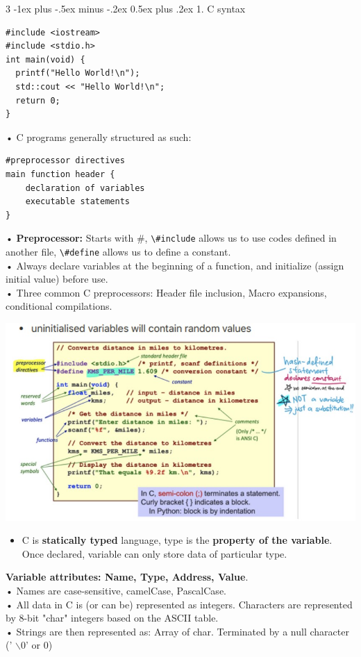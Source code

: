 \documentclass[12pt, landscape]{article}
\makeatletter
\newcommand{\code}[1]{\colorbox{gray!25!}{\lstinline[basicstyle=\scriptsize]|#1|}}
\renewcommand{\section}{\@startsection{section}{1}{0mm}%
                                {-1ex plus -.5ex minus -.2ex}%
                                {0.5ex plus .2ex}%
                                {\normalfont\large\bfseries}}
\makeatother
\begin{document}
\begin{multicols*}{3}
\section{1. C syntax}
\begin{lstlisting}
#include <iostream>
#include <stdio.h>
int main(void) {
  printf("Hello World!\n");
  std::cout << "Hello World!\n";
  return 0;
}
\end{lstlisting}
• C programs generally structured as such: 
\begin{lstlisting}
#preprocessor directives
main function header {
	declaration of variables
	executable statements
}
\end{lstlisting}
• \textbf{Preprocessor:} Starts with \#, \code{\#include} allows us to use codes defined in another file, \code{\#define} allows us to define a constant. \\
• Always declare variables at the beginning of a function, and initialize (assign initial value) before use. \\
• Three common C preprocessors: Header file inclusion, Macro expansions, conditional compilations.
\centerline{\includegraphics[width=1\linewidth]{csyntax}} 

\begin{itemize}
	\item C is \textbf{statically typed} language, type is the \textbf{property of the variable}. Once declared, variable can only store data of particular type. 
\end{itemize}
\textbf{Variable attributes: Name, Type, Address, Value}. \\
• Names are case-sensitive, camelCase, PascalCase.  \\
• All data in C is (or can be) represented as integers. Characters are represented by 8-bit "char" integers based on the ASCII table. \\
• Strings are then represented as: Array of char. Terminated by a null character (' $\backslash$0' or 0) 



\end{multicols*}
\end{document}
